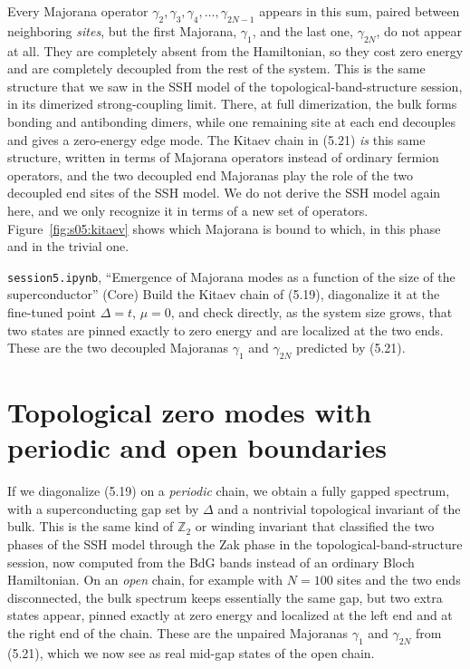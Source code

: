Every Majorana operator $\gamma_2, \gamma_3, \gamma_4, \dots, \gamma_{2N-1}$ appears in this sum,
paired between neighboring \emph{sites}, but the first Majorana, $\gamma_1$, and the last one,
$\gamma_{2N}$, do not appear at all. They are completely absent from the Hamiltonian, so they cost
zero energy and are completely decoupled from the rest of the system. This is the same structure
that we saw in the SSH model of the topological-band-structure session, in its dimerized
strong-coupling limit. There, at full dimerization, the bulk forms bonding and antibonding dimers,
while one remaining site at each end decouples and gives a zero-energy edge mode. The Kitaev chain
in (5.21) \emph{is} this same structure, written in terms of Majorana operators instead of ordinary
fermion operators, and the two decoupled end Majoranas play the role of the two decoupled end sites
of the SSH model. We do not derive the SSH model again here, and we only recognize it in terms of a
new set of operators. Figure~\ref{fig:s05:kitaev} shows which Majorana is bound to which, in this
phase and in the trivial one.



\begin{notebookbox}{\texttt{session5.ipynb}, ``Emergence of Majorana modes as a function of the size of the superconductor'' (Core)}
Build the Kitaev chain of (5.19), diagonalize it at the fine-tuned point $\Delta=t$, $\mu=0$, and
check directly, as the system size grows, that two states are pinned exactly to zero energy and are
localized at the two ends. These are the two decoupled Majoranas $\gamma_1$ and $\gamma_{2N}$
predicted by (5.21).
\end{notebookbox}

\section{Topological zero modes with periodic and open boundaries}

If we diagonalize (5.19) on a \emph{periodic} chain, we obtain a fully gapped spectrum, with a
superconducting gap set by $\Delta$ and a nontrivial topological invariant of the bulk. This is the
same kind of $\mathbb{Z}_2$ or winding invariant that classified the two phases of the SSH model
through the Zak phase in the topological-band-structure session, now computed from the BdG bands
instead of an ordinary Bloch Hamiltonian. On an \emph{open} chain, for example with $N=100$ sites
and the two ends disconnected, the bulk spectrum keeps essentially the same gap, but two extra
states appear, pinned exactly at zero energy and localized at the left end and at the right end of
the chain. These are the unpaired Majoranas $\gamma_1$
and $\gamma_{2N}$ from (5.21), which we now see as real mid-gap states of the open chain.

